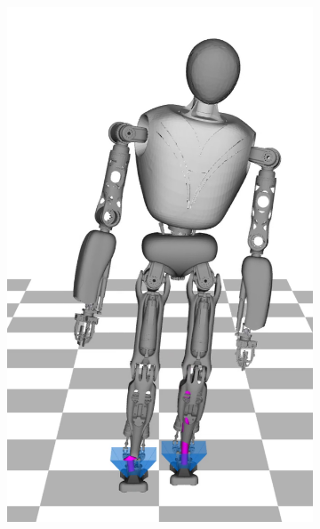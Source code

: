 \begin{figure}
\begin{subfigure}{.16\textwidth}
	\includegraphics[width=1\linewidth]{fig/walkStatic/snaps/4}
	\caption{}
\end{subfigure}%
\begin{subfigure}{.16\textwidth}

\end{subfigure}
\end{figure}
